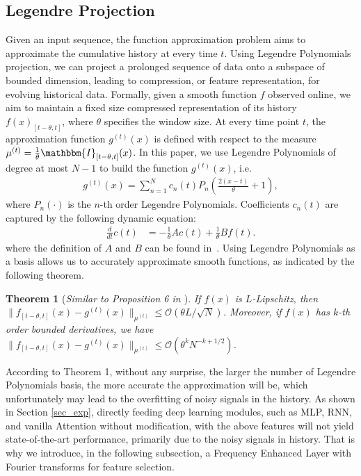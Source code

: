 \documentclass{article}
\newtheorem{theorem}{Theorem}
\begin{document}
\subsection{Legendre Projection}
 Given an input sequence, the function approximation problem aims to approximate the cumulative history at every time $t$. Using Legendre Polynomials projection, we can project a prolonged sequence of data onto a subspace of bounded dimension, leading to compression, or feature representation, for evolving historical data. Formally, given a smooth function $f$ observed online, we aim to maintain a fixed size compressed representation of its history $f(x)_{[t-\theta,t]}$, where $\theta$ specifies the window size. At every time point $t$, the approximation function $g^{(t)}(x)$ is defined with respect to the measure $\mu^{(t)} =\frac{1}{\theta}\mathbbm{I}_{[t-\theta,t]}(x)$. In this paper, we use Legendre Polynomials of degree at most $N-1$ to build the function $g^{(t)}(x)$, i.e.
  \begin{align}
  g^{(t)}(x)=\sum_{n=1}^N c_{n}(t) P_{n}\left(\frac{2(x-t)}{\theta}+1\right), \label{eq:1}
 \end{align}
 where $P_n(\cdot)$ is the $n$-th order Legendre Polynomials. Coefficients $c_{n}(t)$ are captured by the following dynamic equation:
\begin{align}\frac{d}{d t} c(t) &=-\frac{1}{\theta} A c(t)+\frac{1}{\theta} B f(t).
\end{align}
where the definition of $A$ and $B$ can be found in~\cite{LMU}. Using Legendre Polynomials as a basis allows us to accurately approximate smooth functions, as indicated by the following theorem.

\begin{theorem} [\it Similar to Proposition 6 in \cite{Hippo}]
 If $f(x)$ is $L$-Lipschitz, then $\|f_{[t-\theta,t]}(x)-g^{(t)}(x)\|_{\mu^{(t)}}\le \mathcal{O}(\theta L/\sqrt{N})$. Moreover, if $f(x)$ has $k$-th order bounded derivatives, we have $\|f_{[t-\theta,t]}(x)-g^{(t)}(x)\|_{\mu^{(t)}}\le \mathcal{O}(\theta^kN^{-k+1/2})$.
\end{theorem}
According to Theorem 1, without any surprise, the larger the number of Legendre Polynomials basis, the more accurate the approximation will be, which unfortunately may lead to the overfitting of noisy signals in the history. As shown in Section \ref{sec_exp}, directly feeding deep learning modules, such as MLP, RNN, and vanilla Attention without modification, with the above features will not yield state-of-the-art performance, primarily due to the noisy signals in history. That is why we introduce, in the following subsection, a Frequency Enhanced Layer with Fourier transforms for feature selection.  
\end{document}
